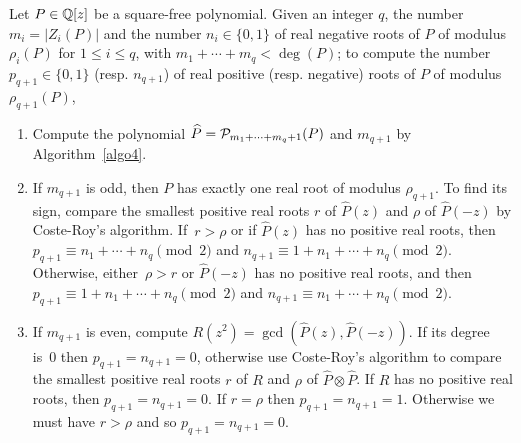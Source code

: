 \begin{alg}\label{algo6}
Let $P \in {\Bbb Q}[z]$ be a square-free polynomial. 
Given an integer $q$, the number~$m_i=|Z_i(P)|$ and  the number
$n_i \in \{ 0,1 \}$ of real negative 
roots of $P$ of modulus $\rho_i(P)$ for $1\le i\le q$, with
$m_1+\cdots+m_q<\deg(P)$; to compute the number $p_{q+1} \in
\{ 0,1\}$ (resp. $n_{q+1}$) of real positive (resp. negative) roots of
$P$ of modulus $\rho_{q+1}(P)$,
\begin{enumerate}
\item Compute the polynomial $\widehat{P}= {\cal
P}_{m_1+\cdots+m_q+1}(P)$ and $m_{q+1}$ by Algorithm~\ref{algo4}.
\item If $m_{q+1}$ is odd, then $P$ has exactly one real root of
modulus $\rho_{q+1}$. To find its sign, compare the smallest positive
real roots $r$ of $\widehat{P}(z)$ and $\rho$ of $\widehat{P}(-z)$ by
Coste-Roy's algorithm. If~$r>\rho$ or if $\widehat{P}(z)$ has no 
positive real roots, then $p_{q+1} \equiv n_1+\cdots+n_q \pmod{2}$
and $n_{q+1} \equiv 1+n_1+\cdots+n_q \pmod{2}$. Otherwise, either~$\rho>r$ or 
$\widehat{P}(-z)$ has no positive real roots, and then $p_{q+1} \equiv
1+n_1+\cdots+n_q \pmod{2}$ and $n_{q+1} \equiv n_1+\cdots+n_q
\pmod{2}$.
\item If $m_{q+1}$ is even, compute
$R(z^2)=\gcd(\widehat{P}(z),\widehat{P}(-z))$. If its degree is~0 then
$p_{q+1}=n_{q+1}=0$, otherwise use Coste-Roy's algorithm to compare
the smallest positive real roots $r$ of $R$ and $\rho$ of $\widehat{P}
\otimes \widehat{P}$.
If $R$ has no positive real roots, then
$p_{q+1}=n_{q+1}=0$.
If $r=\rho$ then $p_{q+1}=n_{q+1}=1$.
Otherwise we must have $r > \rho$ and so
$p_{q+1}=n_{q+1}=0$.
\end{enumerate} 
\end{alg}

